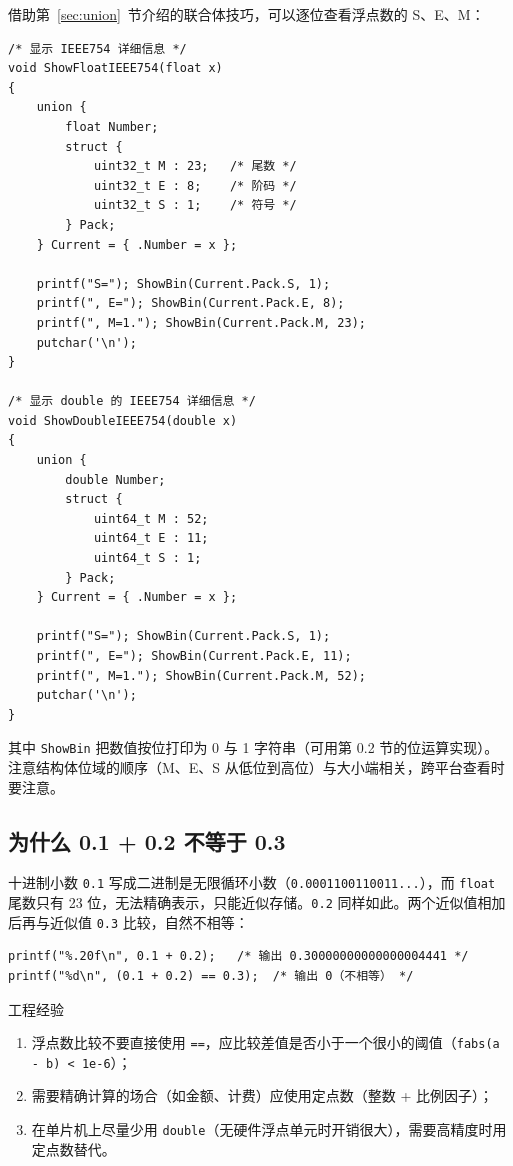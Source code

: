 借助第~\ref{sec:union}~节介绍的联合体技巧，可以逐位查看浮点数的 S、E、M：

\begin{lstlisting}[style=c]
/* 显示 IEEE754 详细信息 */
void ShowFloatIEEE754(float x)
{
    union {
        float Number;
        struct {
            uint32_t M : 23;   /* 尾数 */
            uint32_t E : 8;    /* 阶码 */
            uint32_t S : 1;    /* 符号 */
        } Pack;
    } Current = { .Number = x };

    printf("S="); ShowBin(Current.Pack.S, 1);
    printf(", E="); ShowBin(Current.Pack.E, 8);
    printf(", M=1."); ShowBin(Current.Pack.M, 23);
    putchar('\n');
}

/* 显示 double 的 IEEE754 详细信息 */
void ShowDoubleIEEE754(double x)
{
    union {
        double Number;
        struct {
            uint64_t M : 52;
            uint64_t E : 11;
            uint64_t S : 1;
        } Pack;
    } Current = { .Number = x };

    printf("S="); ShowBin(Current.Pack.S, 1);
    printf(", E="); ShowBin(Current.Pack.E, 11);
    printf(", M=1."); ShowBin(Current.Pack.M, 52);
    putchar('\n');
}
\end{lstlisting}

其中 \texttt{ShowBin} 把数值按位打印为 0 与 1 字符串（可用第 0.2 节的位运算实现）。注意结构体位域的顺序（M、E、S 从低位到高位）与大小端相关，跨平台查看时要注意。

\subsection{为什么 0.1 + 0.2 不等于 0.3}

十进制小数 \texttt{0.1} 写成二进制是无限循环小数（\texttt{0.0001100110011...}），而 \texttt{float} 尾数只有 23 位，无法精确表示，只能近似存储。\texttt{0.2} 同样如此。两个近似值相加后再与近似值 \texttt{0.3} 比较，自然不相等：

\begin{lstlisting}[style=c]
printf("%.20f\n", 0.1 + 0.2);   /* 输出 0.30000000000000004441 */
printf("%d\n", (0.1 + 0.2) == 0.3);  /* 输出 0（不相等） */
\end{lstlisting}

\begin{anybox}{工程经验}

\begin{enumerate}
\item 浮点数比较不要直接使用 \texttt{==}，应比较差值是否小于一个很小的阈值（\texttt{fabs(a - b) < 1e-6}）；
\item 需要精确计算的场合（如金额、计费）应使用定点数（整数 + 比例因子）；
\item 在单片机上尽量少用 \texttt{double}（无硬件浮点单元时开销很大），需要高精度时用定点数替代。
\end{enumerate}

\end{anybox}


